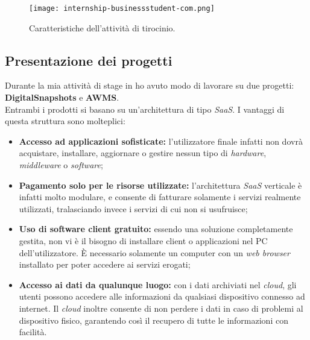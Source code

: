 \begin{figure}[h]
\texttt{[image: internship-businessstudent-com.png]}
\centering
\caption{Caratteristiche dell'attività di tirocinio.} 
\label{fig:internship}
\end{figure}

\subsection{Presentazione dei progetti}
Durante la mia attività di stage in \AD{} ho avuto modo di lavorare su due progetti: \textbf{DigitalSnapshots} e \textbf{AWMS}.\\
Entrambi i prodotti si basano su un'architettura di tipo \textit{SaaS}.
I vantaggi di questa struttura sono molteplici: 
\begin{itemize}
\item \textbf{Accesso ad applicazioni sofisticate:} l'utilizzatore finale infatti non dovrà acquistare, installare, aggiornare o gestire nessun tipo di \textit{hardware}, \textit{middleware} o \textit{software};
\item \textbf{Pagamento solo per le risorse utilizzate:} l'architettura \textit{SaaS} verticale è infatti molto modulare, e consente di fatturare solamente i servizi realmente utilizzati, tralasciando invece i servizi di cui non si usufruisce;
\item \textbf{Uso di software client gratuito:} essendo una soluzione completamente gestita, non vi è il bisogno di installare client o applicazioni nel PC dell'utilizzatore. \`E necessario solamente un computer con un \textit{web browser} installato per poter accedere ai servizi erogati;
\item \textbf{Accesso ai dati da qualunque luogo:} con i dati archiviati nel \textit{cloud}, gli utenti possono accedere alle informazioni da qualsiasi dispositivo connesso ad internet. Il \textit{cloud} inoltre consente di non perdere i dati in caso di problemi al dispositivo fisico, garantendo così il recupero di tutte le informazioni con facilità.
\end{itemize}

